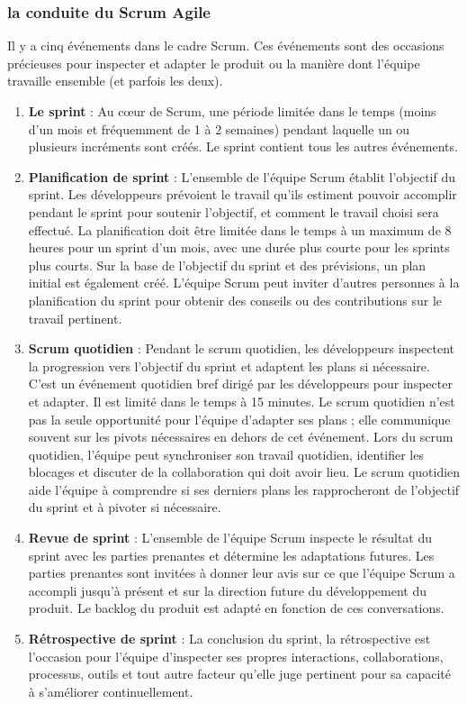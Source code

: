\subsubsection{la conduite du Scrum Agile}
Il y a cinq événements dans le cadre Scrum. Ces événements sont des occasions précieuses pour inspecter et adapter le produit ou la manière dont l'équipe travaille ensemble (et parfois les deux).
\begin{enumerate}
    \item \textbf{Le sprint} : Au cœur de Scrum, une période limitée dans le temps (moins d'un mois et fréquemment de 1 à 2 semaines) pendant laquelle un ou plusieurs incréments sont créés. Le sprint contient tous les autres événements.
    \item \textbf{Planification de sprint} : L'ensemble de l'équipe Scrum établit l'objectif du sprint. Les développeurs prévoient le travail qu'ils estiment pouvoir accomplir pendant le sprint pour soutenir l'objectif, et comment le travail choisi sera effectué. La planification doit être limitée dans le temps à un maximum de 8 heures pour un sprint d'un mois, avec une durée plus courte pour les sprints plus courts. Sur la base de l'objectif du sprint et des prévisions, un plan initial est également créé. L'équipe Scrum peut inviter d'autres personnes à la planification du sprint pour obtenir des conseils ou des contributions sur le travail pertinent.
    \item \textbf{Scrum quotidien} : Pendant le scrum quotidien, les développeurs inspectent la progression vers l'objectif du sprint et adaptent les plans si nécessaire. C'est un événement quotidien bref dirigé par les développeurs pour inspecter et adapter. Il est limité dans le temps à 15 minutes. Le scrum quotidien n'est pas la seule opportunité pour l'équipe d'adapter ses plans ; elle communique souvent sur les pivots nécessaires en dehors de cet événement. Lors du scrum quotidien, l'équipe peut synchroniser son travail quotidien, identifier les blocages et discuter de la collaboration qui doit avoir lieu. Le scrum quotidien aide l'équipe à comprendre si ses derniers plans les rapprocheront de l'objectif du sprint et à pivoter si nécessaire.
    \item \textbf{Revue de sprint} : L'ensemble de l'équipe Scrum inspecte le résultat du sprint avec les parties prenantes et détermine les adaptations futures. Les parties prenantes sont invitées à donner leur avis sur ce que l'équipe Scrum a accompli jusqu'à présent et sur la direction future du développement du produit. Le backlog du produit est adapté en fonction de ces conversations.
    \item \textbf{Rétrospective de sprint} : La conclusion du sprint, la rétrospective est l'occasion pour l'équipe d'inspecter ses propres interactions, collaborations, processus, outils et tout autre facteur qu'elle juge pertinent pour sa capacité à s'améliorer continuellement.
\end{enumerate}
\cite*{scrumalliance}
